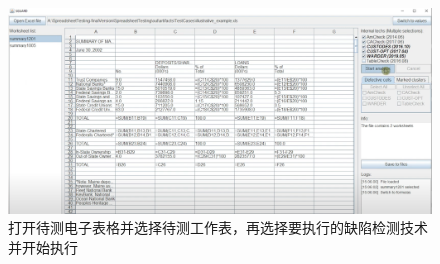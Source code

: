 \begin{figure}[tbp]    
    \centering
    \includegraphics[width=\textwidth]{figure/sg/sguard-4.png}
    \caption{打开待测电子表格并选择待测工作表，再选择要执行的缺陷检测技术并开始执行}
    \label{figure-sg4}
\end{figure}